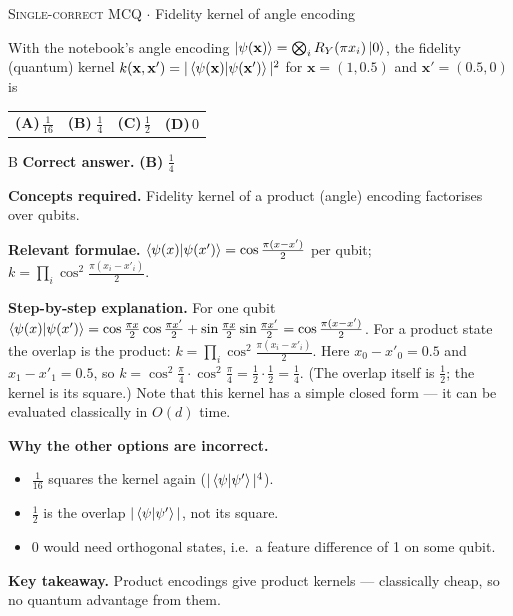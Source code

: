 \documentclass[11pt,a4paper]{article}
\newcommand{\optlabel}[1]{\textbf{(#1)}}
\newcommand{\correctlabel}[1]{\textcolor{okgreen}{\textbf{(#1)}\,\ding{51}}}
\newenvironment{qitem}[1]{\begin{list}{}{\setlength{\leftmargin}{3.3em}\setlength{\labelwidth}{3.1em}%
  \setlength{\labelsep}{0.2em}\setlength{\topsep}{3pt}\setlength{\parsep}{3pt}}\item[\textbf{Q.#1}\hfill]}{\end{list}}
\newcommand{\qsep}{\par\vspace{2pt}{\color{black!15}\hrule}\vspace{4pt}}
\newcommand{\qmeta}[2]{{\footnotesize\color{black!60}\textsc{#1} \;$\cdot$\; #2}\par}
\begin{document}
\begin{qitem}{44}
\qmeta{Single-correct MCQ}{Fidelity kernel of angle encoding}
With the notebook's angle encoding $\ket{\psi(\mathbf x)} = \bigotimes_i R_Y(\pi x_i)\ket0$, the fidelity (quantum) kernel
$k(\mathbf x, \mathbf x') = |\braket{\psi(\mathbf x)|\psi(\mathbf x')}|^2$ for $\mathbf x = (1, 0.5)$ and $\mathbf x' = (0.5, 0)$ is
\par\smallskip\noindent\begin{tabularx}{\linewidth}{@{}*{4}{L}@{}}
\optlabel{A}\,$\frac1{16}$ & \correctlabel{B}\,$\frac14$ & \optlabel{C}\,$\frac12$ & \optlabel{D}\,$0$
\end{tabularx}
\end{qitem}
\begin{solbox}{B}
\textbf{\color{brand}Correct answer.} \textcolor{okgreen}{\textbf{(B)}} $\frac14$

\textbf{\color{brand}Concepts required.} Fidelity kernel of a product (angle) encoding factorises over qubits.

\textbf{\color{brand}Relevant formulae.} $\braket{\psi(x)|\psi(x')} = \cos\frac{\pi(x - x')}{2}$ per qubit; $k = \prod_i\cos^2\frac{\pi(x_i - x'_i)}{2}$.

\textbf{\color{brand}Step-by-step explanation.} For one qubit $\braket{\psi(x)|\psi(x')} = \cos\frac{\pi x}{2}\cos\frac{\pi x'}{2} + \sin\frac{\pi x}{2}\sin\frac{\pi x'}{2} = \cos\frac{\pi(x - x')}{2}$.
For a product state the overlap is the product: $k = \prod_i\cos^2\frac{\pi(x_i - x'_i)}{2}$.
Here $x_0 - x'_0 = 0.5$ and $x_1 - x'_1 = 0.5$, so $k = \cos^2\frac\pi4\cdot\cos^2\frac\pi4 = \frac12\cdot\frac12 = \frac14$.
(The overlap itself is $\frac12$; the kernel is its square.) Note that this kernel has a simple closed form --- it can be evaluated
classically in $O(d)$ time.

\textbf{\color{brand}Why the other options are incorrect.}
\begin{itemize}[leftmargin=2.4em, itemsep=1pt, topsep=2pt]
\item[\textbf{(A)}] $\frac1{16}$ squares the kernel again ($|\braket{\psi|\psi'}|^4$).
\item[\textbf{(C)}] $\frac12$ is the overlap $|\braket{\psi|\psi'}|$, not its square.
\item[\textbf{(D)}] $0$ would need orthogonal states, i.e.\ a feature difference of 1 on some qubit.
\end{itemize}
\textbf{\color{brand}Key takeaway.} Product encodings give product kernels --- classically cheap, so no quantum advantage from them.
\end{solbox}
\qsep
\end{document}
